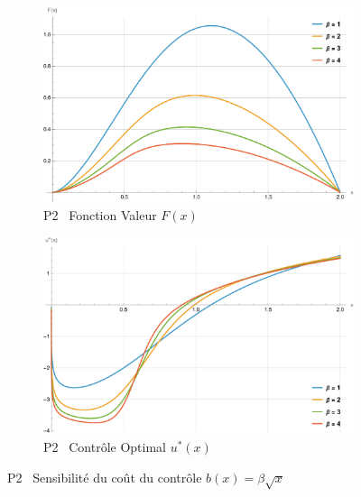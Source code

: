 \FloatBarrier\begin{figure}[htb]
    \centering
    \begin{subfigure}{0.49\linewidth}
        \includegraphics[width=\linewidth]{img/validation/P2/p2_B_value.pdf}
        \caption{P2 \textemdash~Fonction Valeur $F(x)$}\label{fig:BetaValueVisualisation2}
    \end{subfigure}
    \hfill
    \begin{subfigure}{0.49\linewidth}
        \includegraphics[width=\linewidth]{img/validation/P2/p2_B_control.pdf}
        \caption{P2 \textemdash~Contrôle Optimal $u^*(x)$}\label{fig:BetaControlVisualisation2}
    \end{subfigure}
    \caption{P2 \textemdash~Sensibilité du coût du contrôle $b(x)=\beta \sqrt{x}$}\label{fig:BetaValueControlComparison1}
\end{figure}
